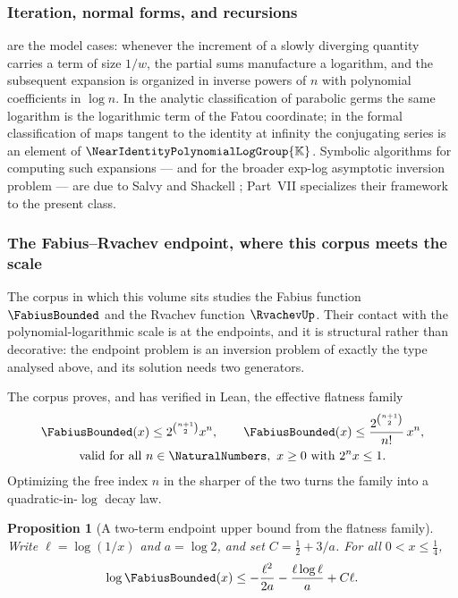 \documentclass[11pt,oneside]{article}
\theoremstyle{plain}
\newtheorem{proposition}[theorem]{Proposition}
\theoremstyle{definition}
\theoremstyle{remark}
\newcommand{\K}{\mathbb{K}}
\newcommand{\Gnear}{\NearIdentityPolynomialLogGroup{\K}} %
\begin{document}
\subsubsection{Iteration, normal forms, and recursions}

 are the model cases: whenever the
increment of a slowly diverging quantity carries a term of size \(1/w\), the
partial sums manufacture a logarithm, and the subsequent expansion is organized
in inverse powers of \(n\) with polynomial coefficients in \(\log n\).  In the
analytic classification of parabolic germs the same logarithm is the
logarithmic term of the Fatou coordinate; in the formal classification of maps
tangent to the identity at infinity the conjugating series is an element of
\(\Gnear\).  Symbolic algorithms for computing such expansions --- and for the
broader exp-log asymptotic inversion problem --- are due to Salvy and Shackell
\cite{salvy-shackell-1998,salvy-shackell-1999}; Part~VII specializes their
framework to the present class.

\subsubsection{The Fabius--Rvachev endpoint, where this corpus meets the scale}

The corpus in which this volume sits studies the Fabius function
\(\FabiusBounded\) and the Rvachev function \(\RvachevUp\).  Their contact with
the polynomial-logarithmic scale is at the endpoints, and it is structural
rather than decorative: the endpoint problem is an inversion problem of exactly
the type analysed above, and its solution needs two generators.

The corpus proves, and has verified in Lean, the effective flatness family
\begin{gather}
  \FabiusBounded(x)\le2^{\binom{n+1}{2}}x^{n},
  \qquad
  \FabiusBounded(x)\le\frac{2^{\binom{n+1}{2}}}{n!}\,x^{n},
  \label{plt:eq:mot-flatness}\\
  \text{valid for all }n\in\NaturalNumbers,\ x\ge0
  \text{ with }2^{n}x\le1 .
  \notag
\end{gather}
Optimizing the free index \(n\) in the sharper of the two turns the family into
a quadratic-in-\(\log\) decay law.

\begin{proposition}[A two-term endpoint upper bound from the flatness family]
\label{plt:prop:mot-fabius-endpoint}
Write \(\ell=\log(1/x)\) and \(a=\log2\), and set \(C=\tfrac12+3/a\).  For all
\(0<x\le\tfrac14\),
\begin{equation}\label{plt:eq:mot-fabius-endpoint}
  \log\FabiusBounded(x)
  \le-\frac{\ell^{2}}{2a}-\frac{\ell\log\ell}{a}+C\ell .
\end{equation}
\end{proposition}
\end{document}
